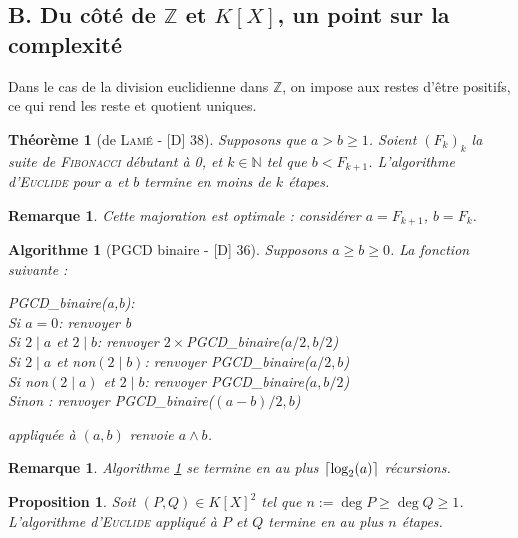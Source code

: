 \documentclass[10pt, a4paper, parskip=full, twoside, twocolumn]{report}
\newtheorem{theorem}[definition]{Théorème}
\newtheorem{proposition}[definition]{Proposition}
\newtheorem{remark}[definition]{Remarque}
\newtheorem{algorithm}[definition]{Algorithme}
\newcommand{\IN}{\mathbb{N}}
\newcommand{\IZ}{\mathbb{Z}}
\begin{document}
\subsection*{B. Du côté de $\IZ$ et $K[X]$, un point sur la complexité}

\textcolor{paragraphtext}{Dans le cas de la division euclidienne dans $\IZ$, on impose aux 
restes d'être positifs, ce qui rend les reste et quotient uniques.}

\begin{theorem}[de \textsc{Lamé} - \textnormal{[D] 38}]
	Supposons que $a>b\geq 1$.
	Soient $\left(F_k\right)_k$ la suite de \textsc{Fibonacci} débutant à 0, et $k\in \IN$ tel 
	que $b< F_{k+1}$. L'algorithme d'\textsc{Euclide} pour $a$ et $b$ termine en moins de $k$ étapes.
\end{theorem}

\begin{remark}
	Cette majoration est optimale : considérer $a = F_{k+1}$, $b = F_k$.
\end{remark}

\begin{algorithm}[PGCD binaire - \textnormal{[D] 36}]
	\label{142algPGCDbinaire}
	Supposons $a \geq b\geq 0$. La fonction suivante : 
	
	\emph{PGCD\_binaire(a,b):} \\
	\indent\indent\emph{Si $a=0$: renvoyer b} \\
	\indent\indent\emph{Si $2\mid a$ et $2\mid b$: renvoyer $2\times $PGCD\_binaire($a/2, b/2$)} \\
	\indent\indent\emph{Si $2\mid a$ et non$(2\mid b)$: renvoyer PGCD\_binaire($a/2, b$)} \\
	\indent\indent\emph{Si non$(2\mid a)$ et $2\mid b$: renvoyer PGCD\_binaire($a, b/2$)} \\
	\indent\indent\emph{Sinon : renvoyer PGCD\_binaire($(a-b)/2, b$)}
	
	appliquée à $(a,b)$ renvoie $a\wedge b$.
\end{algorithm}

\begin{remark}
	Algorithme \ref{142algPGCDbinaire} se termine en au plus $\lceil \textnormal{log}_2(a)\rceil$ récursions.
\end{remark}

\begin{proposition}
	Soit $(P,Q)\in K[X]^2$ tel que $n:= \deg P\geq \deg Q \geq 1$.
	L'algorithme d'\textsc{Euclide} appliqué à $P$ et $Q$ termine en au plus $n$ étapes.
\end{proposition}
\end{document}

